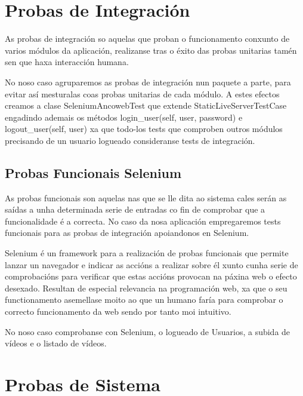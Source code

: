\section{Probas de Integración}

    As probas de integración so aquelas que proban o funcionamento conxunto de varios módulos da 
    aplicación, realizanse tras o éxito das probas unitarias tamén sen que haxa interacción humana.
    
    No noso caso agruparemos as probas de integración nun paquete a parte, para evitar así 
    mesturalas coas probas unitarias de cada módulo. A estes efectos creamos a clase SeleniumAncowebTest
    que extende StaticLiveServerTestCase engadindo ademais os métodos login\_user(self, user, 
    password) e logout\_user(self, user) xa que todo-los tests que comproben outros módulos precisando
    de un usuario logueado consideranse tests de integración.

    \subsection{Probas Funcionais Selenium}

        As probas funcionais son aquelas nas que se lle dita ao sistema cales serán as saídas a unha 
        determinada serie de entradas co fin de comprobar que a funcionalidade é a correcta. No caso da
        nosa aplicación empregaremos tests funcionais para as probas de integración apoiandonos en Selenium.
        
        Selenium é un framework para a realización de probas funcionais que permite lanzar un navegador
        e indicar as accións a realizar sobre él xunto cunha serie de comprobacións para verificar que
        estas accións provocan na páxina web o efecto desexado. Resultan de especial relevancia na 
        programación web, xa que o seu functionamento asemellase moito ao que un humano faría para 
        comprobar o correcto funcionamento da web sendo por tanto moi intuitivo.
        
        No noso caso comprobanse con Selenium, o logueado de Usuarios, a subida de vídeos e o listado de
        vídeos.
    
\section{Probas de Sistema}


